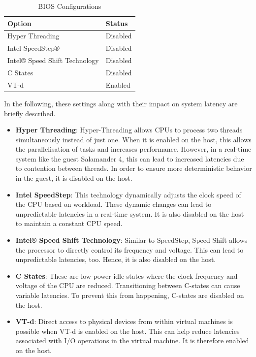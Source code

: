 \documentclass[MMR,Master,english]{twbook}
\begin{document}
\begin{table}[h]
	\centering
	\caption{BIOS Configurations}
	\label{tab:bios_configuration}
	\setlength{\tabcolsep}{0.5em} %
	{\renewcommand{\arraystretch}{1.2}%
	\begin{tabular}{|l|l|}
	\hline
	\textbf{Option} & \textbf{Status} \\
	\hline
	Hyper Threading & Disabled \\
	\hline
	Intel SpeedStep® & Disabled \\
	\hline
	Intel® Speed Shift Technology & Disabled \\
	\hline
	C States & Disabled \\
	\hline
	VT-d & Enabled \\
	\hline
	\end{tabular}}
	\end{table}	
	
	\noindent In the following, these settings along with their impact on system latency are briefly described. 

	\begin{itemize}
		\item \textbf{Hyper Threading}: Hyper-Threading allows CPUs to process two threads simultaneously instead of just one. When it is enabled on the host, this allows the parallelisation of tasks and increases performance. However, in a real-time system like the guest Salamander 4, this can lead to increased latencies due to contention between threads. In order to ensure more deterministic behavior in the guest, it is disabled on the host.
		\item \textbf{Intel SpeedStep}: This technology dynamically adjusts the clock speed of the CPU based on workload. These dynamic changes can lead to unpredictable latencies in a real-time system. It is also disabled on the host to maintain a constant CPU speed.
		\item \textbf{Intel® Speed Shift Technology}: Similar to SpeedStep, Speed Shift allows the processor to directly control its frequency and voltage. This can lead to unpredictable latencies, too. Hence, it is also disabled on the host.
		\item \textbf{C States}: These are low-power idle states where the clock frequency and voltage of the CPU are reduced. Transitioning between C-states can cause variable latencies. To prevent this from happening, C-states are disabled on the host.
		\item \textbf{VT-d}: Direct access to physical devices from within virtual machines is possible when VT-d is enabled on the host. This can help reduce latencies associated with I/O operations in the virtual machine. It is therefore enabled on the host.
	\end{itemize}
\end{document}
